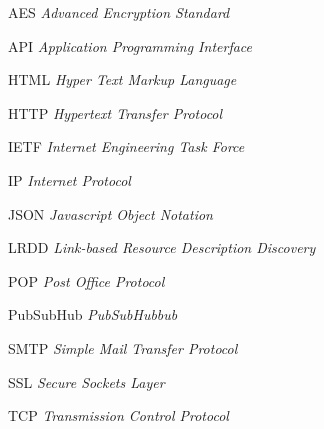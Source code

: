 \begin{siglas}
  \item[AES]       \textit{Advanced Encryption Standard}
  \item[API]       \textit{Application Programming Interface}
  \item[HTML]      \textit{Hyper Text Markup Language}
  \item[HTTP]      \textit{Hypertext Transfer Protocol}
  \item[IETF]      \textit{Internet Engineering Task Force}
  \item[IP]        \textit{Internet Protocol}
  \item[JSON]      \textit{Javascript Object Notation}
  \item[LRDD]      \textit{Link-based Resource Description Discovery}
  \item[POP]       \textit{Post Office Protocol}
  \item[PubSubHub] \textit{PubSubHubbub}
  \item[SMTP]      \textit{Simple Mail Transfer Protocol}
  \item[SSL]       \textit{Secure Sockets Layer}
  \item[TCP]       \textit{Transmission Control Protocol}
\end{siglas}
